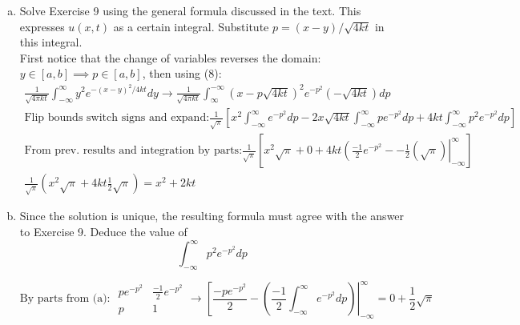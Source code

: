 \newpage
\begin{enumerate}[(a)]
\item
	Solve Exercise 9 using the general formula discussed in the
      text. This expresses $u(x, t)$ as a certain integral. Substitute $p =
      (x - y)/ \sqrt{ 4kt}$ in this integral.\\

      First notice that the change of variables reverses the domain: $y \in  [a,b] \implies  p \in  [a,b]$, then using (8):
\begin{gather*}
	\frac{ 1 }{\sqrt{ 4\pi kt }}\int_{-\infty }^{\infty } y^2e^{-(x-y)^2/4kt}dy \stackrel{ }{\longrightarrow} \frac{ 1 }{\sqrt{ 4\pi kt }}\int_{\infty }^{-\infty } (x-p \sqrt{ 4kt })^2e^{-p^2}(-\sqrt{ 4kt})dp\\ \text{Flip bounds switch signs and expand:}
	\frac{  1 }{ \sqrt{ \pi }}\left[  x^2 \int_{-\infty }^{\infty } e^{-p^2}dp-2x \sqrt{ 4kt}\int_{-\infty }^{\infty } pe^{-p^2}dp+4kt\int_{-\infty }^{\infty } p^2e^{-p^2}dp \right]\\
	\text{From prev. results and integration by parts:}\frac{ 1 }{\sqrt{ \pi }}\left[  x^2 \sqrt{ \pi } +0+ 4kt\left(   \frac{ -1 }{2 }e^{-p^2}  --\frac{ 1 }{2}\left( \sqrt{ \pi } \right)  \right|_{-\infty }^{\infty } \right] \\
		\frac{ 1 }{\sqrt{ \pi }}\left(  x^2 \sqrt{ \pi }+4kt \frac{ 1 }{2}\sqrt{ \pi } \right) =x^2+2kt
\end{gather*}
\item 
	Since the solution is unique, the resulting formula must agree with
the answer to Exercise 9. Deduce the value of
$$\int_{-\infty }^{\infty }p^2e^{-p^2}dp$$


$$
\text{By parts from (a): }
\begin{matrix}
	pe^{-p^2}& \frac{ -1 }{2 }e^{-p^2}\\
	p&1
\end{matrix} \stackrel{ }{\longrightarrow} \left[  \frac{ -pe^{-p^2}}{2 }-\left(  \frac{ -1 }{2 }\int_{-\infty }^{\infty } e^{-p^2}dp \right) \right|_{-\infty }^{\infty }=0+\frac{ 1 }{2 }\sqrt{ \pi}  
$$
\end{enumerate}


